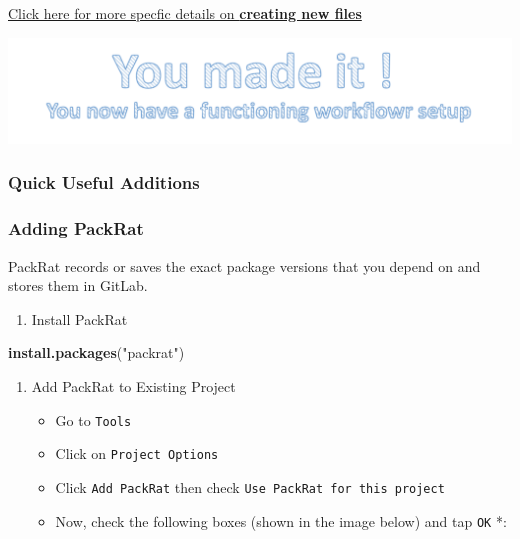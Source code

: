 \documentclass[openany]{book}
\newenvironment{Shaded}{\begin{snugshade}}{\end{snugshade}}
\newcommand{\KeywordTok}[1]{\textcolor[rgb]{0.13,0.29,0.53}{\textbf{#1}}}
\newcommand{\NormalTok}[1]{#1}
\newcommand{\StringTok}[1]{\textcolor[rgb]{0.31,0.60,0.02}{#1}}
\providecommand{\tightlist}{%
  \setlength{\itemsep}{0pt}\setlength{\parskip}{0pt}}
\begin{document}
\protect\hyperlink{adding-new-files}{Click here for more specfic details on \textbf{creating new files}}

\begin{center}\includegraphics[width=0.7\linewidth]{images/Workflow_Photos/uMadeIt2} \end{center}

\hypertarget{quick-useful-additions}{%
\subsubsection{Quick Useful Additions}\label{quick-useful-additions}}

\hypertarget{adding-packrat}{%
\subsubsection{Adding PackRat}\label{adding-packrat}}

PackRat records or saves the exact package versions that you depend on and stores them in GitLab.

\begin{enumerate}
\def\labelenumi{\arabic{enumi}.}
\tightlist
\item
  Install PackRat
\end{enumerate}

\begin{Shaded}
\begin{Highlighting}[]
\KeywordTok{install.packages}\NormalTok{(}\StringTok{"packrat"}\NormalTok{)}
\end{Highlighting}
\end{Shaded}

\begin{enumerate}
\def\labelenumi{\arabic{enumi}.}
\setcounter{enumi}{1}
\item
  Add PackRat to Existing Project

  \begin{itemize}
  \tightlist
  \item
    Go to \texttt{Tools}
  \item
    Click on \texttt{Project\ Options}
  \item
    Click \texttt{Add\ PackRat} then check \texttt{Use\ PackRat\ for\ this\ project}
  \item
    Now, check the following boxes (shown in the image below) and tap \texttt{OK} *:
  \end{itemize}
\end{enumerate}
\end{document}
